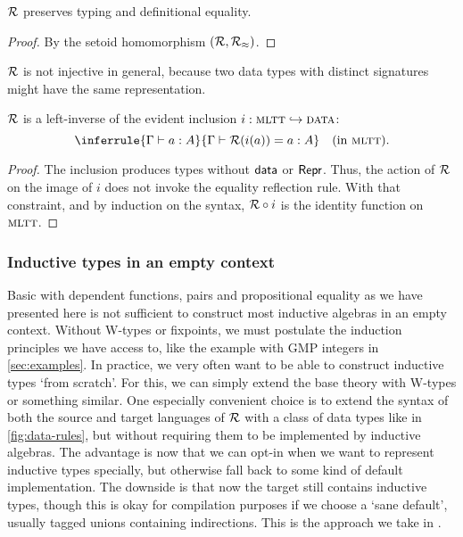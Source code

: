 \begin{theorem}
    $\mathcal{R}$ preserves typing and definitional equality.
    \begin{proof}
    By the setoid homomorphism $(\mathcal{R}, \mathcal{R}_\approx)$.
    \end{proof}
\end{theorem}

$\mathcal{R}$ is not injective in general, because two data types with distinct
signatures might have the same representation.

\begin{theorem}
    $\mathcal{R}$ is a left-inverse of the evident inclusion $i : {\textsc{mltt}} \hookrightarrow {\textsc{data}}$:
    \[
    \inferrule{\Gamma \vdash a : A}{\Gamma \vdash \R(i(a)) = a : A} \quad \text{(in \lambdamltt)}.
    \]
    \begin{proof}
        The inclusion produces types without $\textsf{data}$ or $\textsf{Repr}$. Thus, the action of $\mathcal{R}$ on
        the image of $i$ does not invoke the equality reflection rule. With that
        constraint, and by induction on the syntax, $\mathcal{R} \circ i$ is the identity
        function on ${\textsc{mltt}}$.
    \end{proof}
\end{theorem}

\subsubsection{Inductive types in an empty context}

Basic \lambdamltt with dependent functions, pairs and propositional equality as
we have presented here is not sufficient to construct most inductive algebras in
an empty context. Without W-types or fixpoints, we must postulate the
induction principles we have access to, like the example with GMP integers in
\cref{sec:examples}. In practice, we very often want to be able to construct
inductive types `from scratch'. For this, we can simply extend the base theory
with W-types or something similar. One especially convenient choice is to
extend the syntax of both the source and target languages of $\mathcal{R}$ with a class
of data types like in \cref{fig:data-rules}, but without requiring them to be
implemented by inductive algebras. The advantage is now that we can opt-in when
we want to represent inductive types specially, but otherwise fall back to some
kind of default implementation. The downside is that now the target still
contains inductive types, though this is okay for compilation purposes if we
choose a `sane default', usually tagged unions containing indirections. This is
the approach we take in \superfluid.

